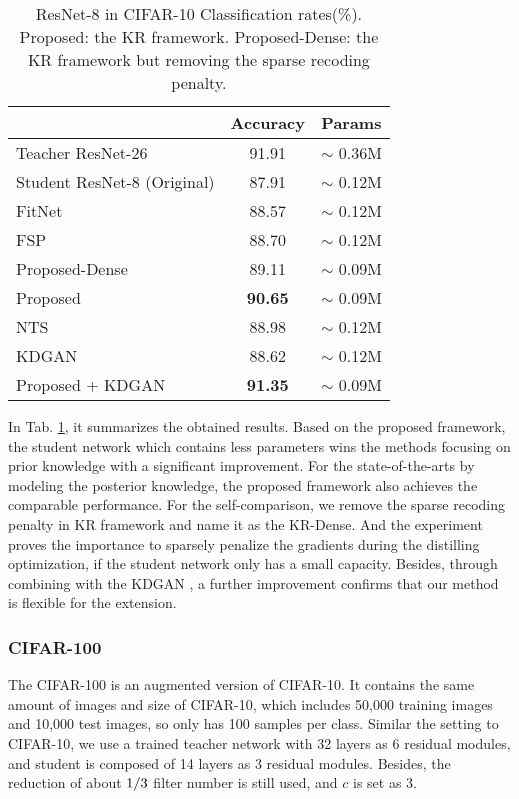 \documentclass[10pt,twocolumn,letterpaper]{article}
\begin{document}
\begin{table}[h]
\begin{center}
\begin{tabular}{l|c|c}
\hline
 & Accuracy & Params\\
\hline
Teacher ResNet-26 & 91.91 & $\sim$ 0.36M\\
Student ResNet-8 (Original) & 87.91 & $\sim$ 0.12M\\
FitNet \cite{Romero2014FitNets} & 88.57 & $\sim$ 0.12M\\
FSP \cite{yim2017gift} & 88.70 & $\sim$ 0.12M\\
Proposed-Dense & 89.11 & $\sim$ 0.09M\\
Proposed & \textbf{90.65} & $\sim$ 0.09M\\
NTS \cite{huang2017like} & 88.98 & $\sim$ 0.12M\\
KDGAN \cite{wang2018kdgan} & 88.62 & $\sim$ 0.12M\\
Proposed + KDGAN \cite{wang2018kdgan} & \textbf{91.35} & $\sim$ 0.09M\\
\hline
\end{tabular}
\end{center}
\caption{ResNet-8 in CIFAR-10 Classification rates(\%). Proposed: the KR framework. Proposed-Dense: the KR framework but removing the sparse recoding penalty.}
\label{tab:cifar10}
\end{table}

In Tab. \ref{tab:cifar10},
it summarizes the obtained results.
Based on the proposed framework,
the student network which contains less parameters
wins the methods \cite{Romero2014FitNets, yim2017gift}
focusing on prior knowledge with a significant improvement.
For the state-of-the-arts \cite{huang2017like, wang2018kdgan} by modeling the posterior knowledge,
the proposed framework also achieves the comparable performance.
For the self-comparison,
we remove the sparse recoding penalty in KR framework and name it as the KR-Dense.
And the experiment proves
the importance to sparsely penalize the gradients during the distilling optimization,
if the student network only has a small capacity.
Besides,
through combining with the KDGAN \cite{wang2018kdgan},
a further improvement confirms that
our method is flexible for the extension.


\subsubsection{CIFAR-100}
The CIFAR-100 is an augmented version of CIFAR-10.
It contains the same amount of images and size of CIFAR-10,
which includes 50,000 training images and 10,000 test images,
so only has 100 samples per class.
Similar the setting to CIFAR-10,
we use a trained teacher network with 32 layers as 6 residual modules,
and student is composed of 14 layers as 3 residual modules.
Besides,
the reduction of about $1\//3$ filter number is still used,
and $c$ is set as 3.
\end{document}
